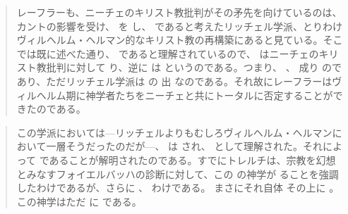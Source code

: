 \begin{quotation}
  レーフラーも、ニーチェのキリスト教批判がその矛先を向けているのは、カントの影響を受け、  を  し、 であると考えたリッチェル学派、とりわけヴィルヘルム・ヘルマン的なキリスト教の再構築にあると見ている。そこでは既に述べた通り、   であると理解されているので、  はニーチェのキリスト教批判に対して   り、逆に  は  というのである。つまり、  、    成り  のであり、ただリッチェル学派は  の  出  なのである。それ故にレーフラーはヴィルヘルム期に神学者たちをニーチェと共にトータルに否定することができたのである。
\end{quotation}

\begin{quotation}
この学派においては---リッチェルよりもむしろヴィルヘルム・ヘルマンにおいて一層そうだったのだが---、  は  され、 として理解された。それによって   であることが解明されたのである。すでにトレルチは、宗教を幻想とみなすフォイエルバッハの診断に対して、この  の神学が  ることを強調したわけであるが、さらに  、 わけである。 まさにそれ自体    その上に 。この神学はただ  に   である。
\end{quotation}

